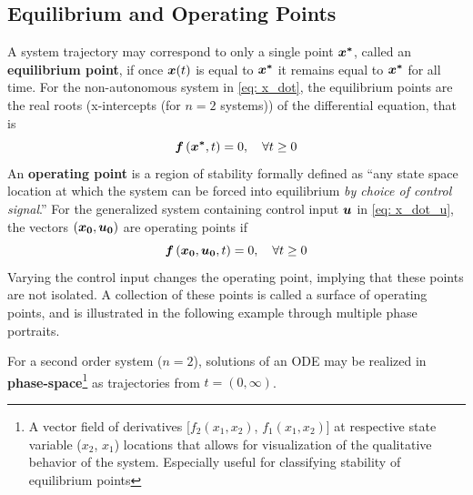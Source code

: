\documentclass[12pt]{ucthesis}
\begin{document}
\subsection{Equilibrium and Operating Points}
\label{subsec: eqm}
%
A system trajectory may correspond to only a single point $\boldsymbol{x^*}$, called an \textbf{equilibrium point}, if once $\boldsymbol{x}(t)$ is equal to $\boldsymbol{x^*}$ it remains equal to $\boldsymbol{x^*}$ for all time. For the non-autonomous system in \autoref{eq: x_dot}, the equilibrium points are the real roots (x-intercepts (for $n=2$ systems)) of the differential equation, that is 
	\begin{equation} \label{eq: eqm_pt}
		\boldsymbol{f} \left( \boldsymbol{x^*},t \right) = 0, \quad \forall t \geq 0
	\end{equation}
An \textbf{operating point} is a region of stability formally defined as ``any state space location at which the system can be forced into equilibrium \textit{by choice of control signal}.'' For the generalized system containing control input $\boldsymbol{u}$ in \autoref{eq: x_dot_u}, the vectors $(\boldsymbol{x_0},\boldsymbol{u_0})$ are operating points if
	\begin{equation} \label{eq: eqm_pt_u}
		\boldsymbol{f} \left( \boldsymbol{x_0},\boldsymbol{u_0},t \right) = 0, \quad \forall t \geq 0
	\end{equation}
Varying the control input changes the operating point, implying that these points are not isolated. A collection of these points is called a surface of operating points, and is illustrated in the following example through multiple phase portraits. 

For a second order system ($n=2$), solutions of an ODE may be realized in \textbf{phase-space}\footnote{A vector field of derivatives [$f_2(x_1,x_2)$, $f_1(x_1,x_2)$] at respective state variable ($x_2$, $x_1$) locations that allows for visualization of the qualitative behavior of the system. Especially useful for classifying stability of equilibrium points} as trajectories from $t = (0,\infty)$.
\end{document}
